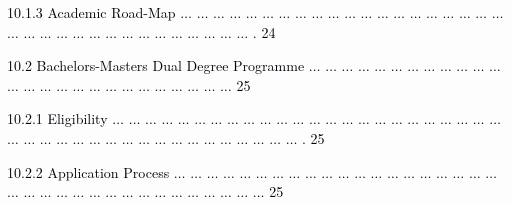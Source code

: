 \documentclass[12pt]{article}
\begin{document}
\vspace{\baselineskip}
\begin{adjustwidth}{0.5in}{0.0in}
{\fontsize{7pt}{8.4pt}\selectfont \textcolor[HTML]{00000A}{10.1.3 Academic Road-Map $ \ldots $ $ \ldots $ $ \ldots $ $ \ldots $ $ \ldots $ $ \ldots $ $ \ldots $ $ \ldots $ $ \ldots $ $ \ldots $ $ \ldots $ $ \ldots $ $ \ldots $ $ \ldots $ $ \ldots $ $ \ldots $ $ \ldots $ $ \ldots $ $ \ldots $ $ \ldots $ $ \ldots $ $ \ldots $ $ \ldots $ $ \ldots $ $ \ldots $ $ \ldots $ $ \ldots $ $ \ldots $ $ \ldots $ $ \ldots $ $ \ldots $ $ \ldots $ $ \ldots $ $ \ldots $ $ \ldots $ . 24}\par}\par

\end{adjustwidth}


\vspace{\baselineskip}
\begin{adjustwidth}{0.21in}{0.0in}
{\fontsize{7pt}{8.4pt}\selectfont \textcolor[HTML]{00000A}{10.2 Bachelors-Masters Dual Degree Programme $ \ldots $ $ \ldots $ $ \ldots $ $ \ldots $ $ \ldots $ $ \ldots $ $ \ldots $ $ \ldots $ $ \ldots $ $ \ldots $ $ \ldots $ $ \ldots $ $ \ldots $ $ \ldots $ $ \ldots $ $ \ldots $ $ \ldots $ $ \ldots $ $ \ldots $ $ \ldots $ $ \ldots $ $ \ldots $ $ \ldots $ $ \ldots $ $ \ldots $ $ \ldots $  25}\par}\par

\end{adjustwidth}


\vspace{\baselineskip}
\begin{adjustwidth}{0.5in}{0.0in}
{\fontsize{7pt}{8.4pt}\selectfont \textcolor[HTML]{00000A}{10.2.1 Eligibility $ \ldots $ $ \ldots $ $ \ldots $ $ \ldots $ $ \ldots $ $ \ldots $ $ \ldots $ $ \ldots $ $ \ldots $ $ \ldots $ $ \ldots $ $ \ldots $ $ \ldots $ $ \ldots $ $ \ldots $ $ \ldots $ $ \ldots $ $ \ldots $ $ \ldots $ $ \ldots $ $ \ldots $ $ \ldots $ $ \ldots $ $ \ldots $ $ \ldots $ $ \ldots $ $ \ldots $ $ \ldots $ $ \ldots $ $ \ldots $ $ \ldots $ $ \ldots $ $ \ldots $ $ \ldots $ $ \ldots $ $ \ldots $ $ \ldots $ $ \ldots $ $ \ldots $ $ \ldots $ $ \ldots $ $ \ldots $ . 25}\par}\par

\end{adjustwidth}


\vspace{\baselineskip}
\begin{adjustwidth}{0.5in}{0.0in}
{\fontsize{7pt}{8.4pt}\selectfont \textcolor[HTML]{00000A}{10.2.2 Application Process $ \ldots $ $ \ldots $ $ \ldots $ $ \ldots $ $ \ldots $ $ \ldots $ $ \ldots $ $ \ldots $ $ \ldots $ $ \ldots $ $ \ldots $ $ \ldots $ $ \ldots $ $ \ldots $ $ \ldots $ $ \ldots $ $ \ldots $ $ \ldots $ $ \ldots $ $ \ldots $ $ \ldots $ $ \ldots $ $ \ldots $ $ \ldots $ $ \ldots $ $ \ldots $ $ \ldots $ $ \ldots $ $ \ldots $ $ \ldots $ $ \ldots $ $ \ldots $ $ \ldots $ $ \ldots $ $ \ldots $ $ \ldots $  25}\par}\par

\end{adjustwidth}
\end{document}
